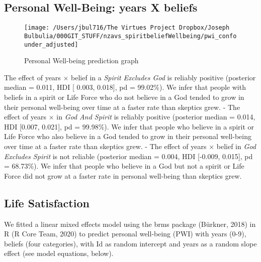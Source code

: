 \documentclass[
  english,
  man,floatsintext]{apa6}
\begin{document}
\hypertarget{personal-well-being-years-x-beliefs}{%
\subsection{Personal Well-Being: years X beliefs}\label{personal-well-being-years-x-beliefs}}

\begin{figure}
\texttt{[image: /Users/jbul716/The Virtues Project Dropbox/Joseph Bulbulia/000GIT\_STUFF/nzavs\_spiritbeliefWellbeing/pwi\_confounder\_adjusted]} \caption{Personal Well-being prediction graph}\label{fig:unnamed-chunk-2}
\end{figure}

The effect of years \(\times\) belief in a \emph{Spirit Excludes God} is reliably positive (posterior median = 0.011, HDI {[} 0.003, 0.018{]}, pd = 99.02\%). We infer that people with beliefs in a spirit or Life Force who do not believe in a God tended to grow in their personal well-being over time at a faster rate than skeptics grew.
- The effect of years \(\times\) in \emph{God And Spirit} is reliably positive (posterior median = 0.014, HDI {[}0.007, 0.021{]}, pd = 99.98\%). We infer that people who believe in a spirit or Life Force who also believe in a God tended to grow in their personal well-being over time at a faster rate than skeptics grew.
- The effect of years \(\times\) belief in \emph{God Excludes Spirit} is not reliable (posterior median = 0.004, HDI {[}-0.009, 0.015{]}, pd = 68.73\%). We infer that people who believe in a God but not a spirit or Life Force did not grow at a faster rate in personal well-being than skeptics grew.

\hypertarget{life-satisfaction-1}{%
\subsection{Life Satisfaction}\label{life-satisfaction-1}}

We fitted a linear mixed effects model using the brms package (Bürkner, 2018) in R (R Core Team, 2020) to predict personal well-being (PWI) with years (0-9), beliefs (four categories), with Id as random intercept and years as a random slope effect (see model equations, below).
\end{document}
